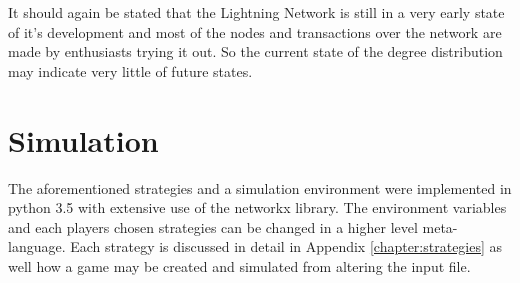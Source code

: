 It should again be stated that the Lightning Network is still in a very early state of it's development and most of the nodes and transactions over the network are made by enthusiasts trying it out. So the current state of the degree distribution may indicate very little of future states. 

\section{Simulation}

The aforementioned strategies and a simulation environment were implemented in python 3.5 with extensive use of the networkx library. The environment variables and each players chosen strategies can be changed in a higher level meta-language. Each strategy is discussed in detail in Appendix \ref{chapter:strategies} as well how a game may be created and simulated from altering the input file.  




